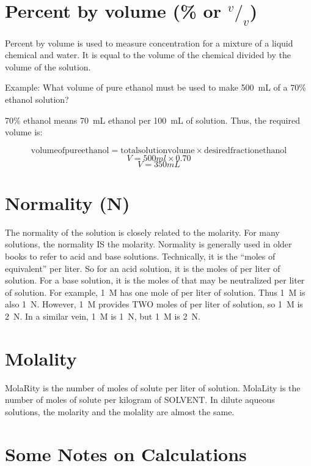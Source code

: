 \section{Percent by volume \texorpdfstring{(\% or $^v/_v$)}{}}

Percent by volume is used to measure concentration for a mixture of a liquid chemical and water. It is equal to the volume of the chemical divided by the volume of the solution.

Example: What volume of pure ethanol must be used to make 500~mL of a 70\% ethanol solution?

70\% ethanol means 70~mL ethanol per 100~mL of solution. Thus, the required volume is:

\[ \mathrm{volume of pure ethanol} = \mathrm{total solution volume} \times \mathrm{desired fraction ethanol} \]
\[ V = 500ml \times 0.70 \]
\[ V = 350 mL \] 

\section{Normality (N)}

The normality of the solution is closely related to the molarity. For many solutions, the normality IS the molarity. Normality is generally used in older books to refer to acid and base solutions. Technically, it is the ``moles of equivalent'' per liter. So for an acid solution, it is the moles of  per liter of solution. For a base solution, it is the moles of  that may be neutralized per liter of solution. For example, 1~M  has one mole of  per liter of solution. Thus 1~M  is also 1~N. However, 1~M  provides TWO moles of  per liter of solution, so 1~M  is 2~N. In a similar vein, 1~M  is 1~N, but 1~M  is 2~N.

\section{Molality}

MolaRity is the number of moles of solute per liter of solution. MolaLity is the number of moles of solute per kilogram of SOLVENT. In dilute aqueous solutions, the molarity and the molality are almost the same.

\section{Some Notes on Calculations}

